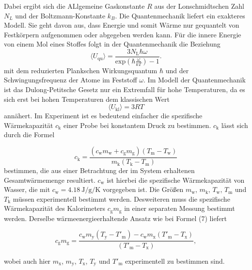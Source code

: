 \documentclass[
  bibliography=totoc,     %
  captions=tableheading,  %
  titlepage=firstiscover, %
]{scrartcl}
\begin{document}
Dabei ergibt sich die ALlgemeine Gaskonstante $R$ aus der Lonschmidtschen Zahl $N_L$
und der Boltzmann-Konstante $k_B$.
Die Quantenmechanik liefert ein exakteres Modell. Sie geht davon aus, dass
Energie und somit Wärme nur gequantelt von Festkörpern aufgenommen oder
abgegeben werden kann. Für die innere Energie von einem Mol eines Stoffes folgt
in der Quantenmechanik die Beziehung
\begin{equation}
  \langle U_{\mathup{qu}}\rangle=\frac{3N_{\mathup{L}}\hbar\omega}{\mathup{exp}\left(\hbar\frac{\omega}{kT}\right)-1}.
\end{equation}
mit dem reduzierten Plankschen Wirkungsquantum $\hbar$ und der Schwingungsfrequenz der
Atome im Feststoff $\omega$. Im Modell der Quantenmechanik ist das Dulong-Petitsche
Gesetz nur ein Extremfall für hohe Temperaturen, da es sich erst bei hohen
Temperaturen dem klassischen Wert
\begin{equation}
  \langle U_{\mathup{kl}}\rangle=3RT
\end{equation}
annähert. Im Experiment ist es bedeutend einfacher die spezifische Wärmekapazität $c_{\mathup{k}}$ einer Probe bei
konstantem Druck zu bestimmen. $c_{\mathup{k}}$ lässt sich durch die Formel

\begin{equation}
  c_{\mathup{k}}=\frac{\left(c_{\mathup{w}}m_{\mathup{w}}+c_{\mathup{g}}m_{\mathup{g}}\right)\left(T_{\mathup{m}}-T_{\mathup{w}}\right)}{m_{\mathup{k}}\left(T_{\mathup{k}}-T_{\mathup{m}}\right)}
\end{equation}
bestimmen, die aus einer Betrachtung der im System erhaltenen Gesamtwärmemenge resultiert.
$c_{\mathup{w}}$ ist hierbei die spezifische Wärmekapazität von Wasser,
die mit $c_{\mathup{w}}=\SI{4.18}{\joule\per\gram\per\kelvin}$ vorgegeben ist.
Die Größen $m_{\mathup{w}}$, $m_{\mathup{k}}$, $T_{\mathup{w}}$, $T_{\mathup{m}}$ und $T_{\mathup{k}}$ müssen
experimentell bestimmt werden.
Desweiteren muss die spezifische Wärmekapazität des Kalorimeters $c_{\mathup{g}}m_{\mathup{g}}$ in einer
separaten Messung bestimmt werden. Derselbe wärmeenergieerhaltende Ansatz wie bei Formel (7) liefert

\begin{equation}
  c_{\mathup{g}}m_{\mathup{g}}=\frac{c_{\mathup{w}}m_{\mathup{y}}\left(T_{\mathup{y}}-T'_{\mathup{m}}\right)-c_{\mathup{w}}m_{\mathup{x}}\left(T'_{\mathup{m}}-T_{\mathup{x}}\right)}{\left(T'_{\mathup{m}}-T_{\mathup{x}}\right)},
\end{equation}

wobei auch hier $m_{\mathup{x}}$, $m_{\mathup{y}}$, $T_{\mathup{x}}$, $T_{\mathup{y}}$ und $T'_{\mathup{m}}$
experimentell zu bestimmen sind.
\end{document}
